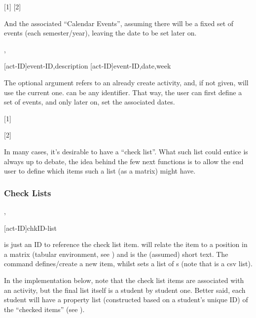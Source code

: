 \documentclass[10pt]{article}
\begin{document}
[1]
[2]


And the associated ``Calendar Events'', assuming there will be a fixed set of events (each semester/year), leaving the date to be set later on. 

\begin{codedescribe}{\ActivitySetNewEvent,\ActivitySetEventDay}
\begin{codesyntax}
  \tsmacro{\ActivitySetNewEvent}[act-ID]{event-ID,description}
  \tsmacro{\ActivitySetEventDay}[act-ID]{event-ID,date,week}
\end{codesyntax}
The optional argument  refers to an already create activity, and, if not given, will use the current one.  can be any identifier. That way, the user can first define a set of events, and only later on, set the associated dates.
\end{codedescribe}


[1]



[2]



In many cases, it's desirable to have a ``check list''. What such list could entice is always up to debate, the idea behind the few next functions is to allow the end user to define which items such a list (as a matrix) might have.

\subsubsection{Check Lists}
\begin{codedescribe}{\checkdef,\checklist}
\begin{codesyntax}
  \tsmacro{\checklist}[act-ID]{chkID-list}
\end{codesyntax}
   is just an ID to reference the check list item.  will relate the item to a position in a matrix (tabular environment, see \tsobj{\StudentCheckListTable}) and  is the (assumed) short text.
  The command \tsobj{\checkdef} defines/create a new item, whilst \tsobj{\checklist} sets a list of s (note that  is a csv list).
\end{codedescribe}
\begin{tsremark}
  In the implementation below, note that the check list items are associated with an activity, but the final list itself is a student by student one. Better said, each student will have a property list (constructed based on a student's unique ID) of the ``checked items'' (see \tsobj{\StudentCheckListTable}).
\end{tsremark}
\end{document}
